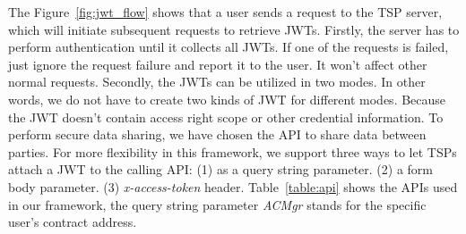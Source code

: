 The Figure~\ref{fig:jwt_flow} shows that a user sends a request to the TSP server, which will initiate subsequent requests to retrieve JWTs. Firstly, the server has to perform authentication until it collects all JWTs. If one of the requests is failed, just ignore the request failure and report it to the user. It won't affect other normal requests. Secondly, the JWTs can be utilized in two modes. In other words, we do not have to create two kinds of JWT for different modes. Because the JWT doesn't contain access right scope or other credential information. To perform secure data sharing, we have chosen the API to share data between parties. For more flexibility in this framework, we support three ways to let TSPs attach a JWT to the calling API: (1) as a query string parameter. (2) a form body parameter. (3) \textit{x-access-token} header. Table~\ref{table:api} shows the APIs used in our framework, the query string parameter \textit{ACMgr} stands for the specific user's contract address.
